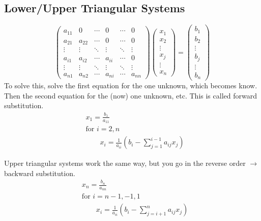 \documentclass[12pt]{article}
\begin{document}
\subsection{Lower/Upper Triangular Systems}
\begin{equation}
   \begin{pmatrix}
      a_{11} & 0      & \cdots & 0      & \cdots & 0 \\
      a_{21} & a_{22} & \cdots & 0      & \cdots & 0 \\
      \vdots & \vdots & \ddots & \vdots & \ddots & \vdots \\     
      a_{i1} & a_{i2} & \cdots & a_{ii} & \cdots & 0 \\
      \vdots & \vdots & \ddots & \vdots & \ddots & \vdots \\
      a_{n1} & a_{n2} & \cdots & a_{ni} & \cdots & a_{nn} 
    \end{pmatrix} 
    \begin{pmatrix} x_1 \\ x_2 \\ \vdots \\ x_j \\ \vdots \\ x_n \end{pmatrix} =
    \begin{pmatrix} b_1 \\ b_2 \\ \vdots \\ b_j \\ \vdots \\ b_n \end{pmatrix}
    \nonumber   
\end{equation} 
%
To solve this, solve the first equation for the one unknown, which becomes know. Then the second equation for the (now) one unknown, etc. This is called forward substitution.
%
\begin{align}
&x_1 = \frac{b_1}{a_{11}} \nonumber \\
&\text{for } i = 2, n \nonumber \\
&\qquad x_i = \frac{1}{a_{ii}}(b_i - \sum_{j=1}^{i-1} a_{ij} x_j) \nonumber
\end{align}

Upper triangular systems work the same way, but you go in the reverse order $\rightarrow$ backward substitution. 
%
\begin{align}
&x_n = \frac{b_n}{a_{nn}} \nonumber \\
&\text{for } i = n-1, -1, 1 \nonumber \\
&\qquad x_i = \frac{1}{a_{ii}}(b_i - \sum_{j=i+1}^{n} a_{ij} x_j) \nonumber
\end{align}
\end{document}
